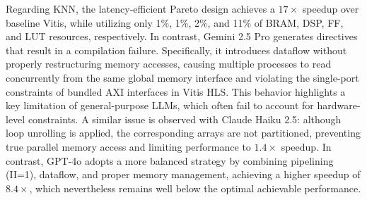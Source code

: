 Regarding KNN, the latency-efficient Pareto design achieves a $17\times$ speedup over baseline Vitis, while utilizing only 1\%, 1\%, 2\%, and 11\% of BRAM, DSP, FF, and LUT resources, respectively. In contrast, Gemini 2.5 Pro generates directives that result in a compilation failure. 
Specifically, it introduces dataflow without properly restructuring memory accesses, causing multiple processes to read concurrently from the same global memory interface and violating the single-port constraints of bundled AXI interfaces in Vitis HLS.
This behavior highlights a key limitation of general-purpose LLMs, which often fail to account for hardware-level constraints.
A similar issue is observed with Claude Haiku 2.5: although loop unrolling is applied, the corresponding arrays are not partitioned, preventing true parallel memory access and limiting performance to $1.4\times$ speedup. In contrast, GPT-4o adopts a more balanced strategy by combining pipelining (II=1), dataflow, and proper memory management, achieving a higher speedup of $8.4\times$, which nevertheless remains well below the optimal achievable performance.


